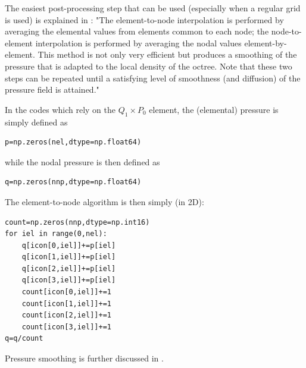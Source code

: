 The easiest post-processing step that can be used (especially when a regular grid is used) 
is explained in \cite{thfb08}: "The element-to-node interpolation is performed by
averaging the elemental values from elements common to each node; 
the node-to-element interpolation is performed
by averaging the nodal values element-by-element. This
method is not only very efficient but produces a smoothing
of the pressure that is adapted to the local density of the
octree. Note that these two steps can be repeated until a
satisfying level of smoothness (and diffusion) of the pressure field is attained."

In the codes which rely on the $Q_1 \times P_0$ element, the (elemental) pressure
is simply defined as 
\begin{lstlisting}
p=np.zeros(nel,dtype=np.float64)  
\end{lstlisting}
while the nodal pressure is then defined as 
\begin{lstlisting}
q=np.zeros(nnp,dtype=np.float64)  
\end{lstlisting}
The element-to-node algorithm is then simply (in 2D):

\begin{lstlisting}
count=np.zeros(nnp,dtype=np.int16)  
for iel in range(0,nel):
    q[icon[0,iel]]+=p[iel]
    q[icon[1,iel]]+=p[iel]
    q[icon[2,iel]]+=p[iel]
    q[icon[3,iel]]+=p[iel]
    count[icon[0,iel]]+=1
    count[icon[1,iel]]+=1
    count[icon[2,iel]]+=1
    count[icon[3,iel]]+=1
q=q/count
\end{lstlisting}

Pressure smoothing is further discussed in \cite{hulb79}.









